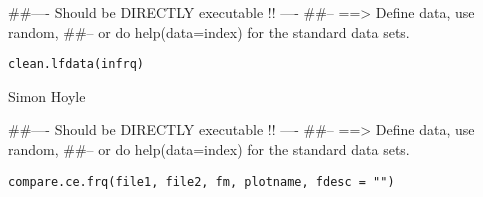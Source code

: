\documentclass[a4paper]{book}
\begin{document}
%
\begin{Examples}
\begin{ExampleCode}
##---- Should be DIRECTLY executable !! ----
##-- ==>  Define data, use random,
##--	or do  help(data=index)  for the standard data sets.

\end{ExampleCode}
\end{Examples}
%
\begin{Usage}
\begin{verbatim}
clean.lfdata(infrq)
\end{verbatim}
\end{Usage}
%
\begin{Arguments}
\begin{ldescription}
\item[\code{infrq}] 


\end{ldescription}
\end{Arguments}
%
\begin{Author}\relax
Simon Hoyle

\end{Author}
%
\begin{Examples}
\begin{ExampleCode}
##---- Should be DIRECTLY executable !! ----
##-- ==>  Define data, use random,
##--	or do  help(data=index)  for the standard data sets.

\end{ExampleCode}
\end{Examples}
%
\begin{Usage}
\begin{verbatim}
compare.ce.frq(file1, file2, fm, plotname, fdesc = "")
\end{verbatim}
\end{Usage}
%
\begin{Arguments}
\begin{ldescription}
\item[\code{file1}] 


\item[\code{file2}] 


\item[\code{fm}] 


\item[\code{plotname}] 


\item[\code{fdesc}] 


\end{ldescription}
\end{Arguments}
\end{document}
